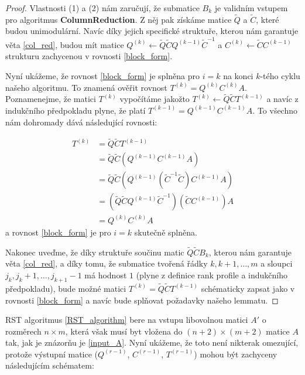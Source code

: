 \begin{proof}
Vlastnosti (1) a (2) nám zaručují, že submatice $ B_k $ je validním vstupem pro
algoritmus \textbf{ColumnReduction}. Z něj pak získáme matice $ \tilde{Q} $ a
$ \tilde{C} $, které budou unimodulární. Navíc díky jejich specifické struktuře,
kterou nám garantuje věta \ref{col_red}, budou mít matice
$ { Q^{(k)} \leftarrow \tilde{Q} \tilde{C} Q^{(k - 1)} \tilde{C}^{-1} } $ a
$ { C^{(k)} \leftarrow \tilde{C} C^{(k - 1)} } $
strukturu zachycenou v rovnosti \ref{block_form}.

Nyní ukážeme, že rovnost \ref{block_form} je splněna pro $ i = k $
na konci $ k $-tého cyklu našeho algoritmu. To znamená ověřit rovnost
$ T^{(k)} = Q^{(k)} C^{(k)} A $. Poznamenejme, že matici $ T^{(k)} $ vypočítáme
jakožto $ T^{(k)} \leftarrow \tilde{Q} \tilde{C} T^{(k - 1)} $ a navíc
z indukčního předpokladu plyne, že platí $ T^{(k - 1)} = Q^{(k - 1)} C^{(k - 1)} A $.
To všechno nám dohromady dává následující rovnosti:

\begin{align*}
    T^{(k)} &= \tilde{Q} \tilde{C} T^{(k - 1)} \\
            &= \tilde{Q} \tilde{C} (Q^{(k - 1)} C^{(k - 1)} A) \\
            &= \tilde{Q} \tilde{C} (Q^{(k - 1)} (\tilde{C}^{-1} \tilde{C}) C^{(k - 1)} A) \\
            &= (\tilde{Q} \tilde{C} Q^{(k - 1)} \tilde{C}^{-1}) (\tilde{C} C^{(k - 1)}) A \\
            &= Q^{(k)} C^{(k)} A
\end{align*}
a rovnost \ref{block_form} je pro $ i = k $ skutečně splněna.

Nakonec uveďme, že díky struktuře součinu matic $ \tilde{Q} \tilde{C} B_k $, kterou
nám garantuje věta \ref{col_red}, a díky tomu, že submatice tvořená řádky
$ k, k+1, \dots, m $ a sloupci $ j_k, j_k + 1, \dots, j_{k+1} - 1 $ má hodnost
$ 1 $ (plyne z definice rank profile a indukčního předpokladu), bude možné matici
$ T^{(k)} = \tilde{Q} \tilde{C} T^{(k - 1)} $ schématicky zapsat jako v rovnosti
\ref{block_form} a navíc bude splňovat požadavky našeho lemmatu.
\end{proof}

RST algoritmus \ref{RST_algorithm} bere na vstupu libovolnou matici $ A' $ o
rozměrech $ n \times m $, která však musí byt vložena do $ (n + 2) \times (m + 2) $
matice $ A $ tak, jak je znázorňu je \ref{input_A}. Nyní ukážeme, že toto není
nikterak omezující, protože výstupní matice
($ Q^{(r - 1)} $, $ C^{(r - 1)} $, $ T^{(r - 1)} $) mohou být zachyceny
následujícím schématem:

